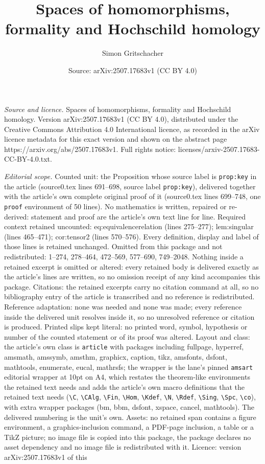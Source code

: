 \documentclass[10pt,a4paper]{amsart}
\title[Spaces of homomorphisms, formality and Hochschild homology]{Spaces of homomorphisms, formality and Hochschild homology}
\author{Simon Gritschacher}
\date{Source: arXiv:2507.17683v1 (CC BY 4.0)}
\begin{document}
\maketitle

\noindent\emph{Source and licence.} Spaces of homomorphisms, formality and Hochschild homology. Version arXiv:2507.17683v1 (CC BY 4.0), distributed under the Creative Commons Attribution 4.0 International licence, as recorded in the arXiv licence metadata for this exact version and shown on the abstract page https://arxiv.org/abs/2507.17683v1. Full rights notice: licenses/arxiv-2507.17683-CC-BY-4.0.txt.\par\smallskip

\noindent\textit{Editorial scope.} Counted unit: the Proposition whose source label is \texttt{prop:key} in the article (source0.tex lines 691--698, source label \texttt{prop:key}), delivered together with the article's own complete original proof of it (source0.tex lines 699--748, one \texttt{proof} environment of 50 lines). No mathematics is written, repaired or re-derived: statement and proof are the article's own text line for line. Required context retained uncounted: eq:equivalencerelation (lines 275--277); lem:singular (lines 465--471); cor:tensor2 (lines 570--576). Every definition, display and label of those lines is retained unchanged. Omitted from this package and not redistributed: 1--274, 278--464, 472--569, 577--690, 749--2048. Nothing inside a retained excerpt is omitted or altered: every retained body is delivered exactly as the article's lines are written, so no omission receipt of any kind accompanies this package. Citations: the retained excerpts carry no citation command at all, so no bibliography entry of the article is transcribed and no reference is redistributed. Reference adaptation: none was needed and none was made; every reference inside the delivered unit resolves inside it, so no unresolved reference or citation is produced. Printed slips kept literal: no printed word, symbol, hypothesis or number of the counted statement or of its proof was altered. Layout and class: the article's own class is \texttt{article} with packages including fullpage, hyperref, amsmath, amssymb, amsthm, graphicx, caption, tikz, amsfonts, dsfont, mathtools, enumerate, eucal, mathrsfs; the wrapper is the lane's pinned \texttt{amsart} editorial wrapper at 10pt on A4, which restates the theorem-like environments the retained text needs and adds the article's own macro definitions that the retained text needs (\texttt{\textbackslash C}, \texttt{\textbackslash CAlg}, \texttt{\textbackslash Fin}, \texttt{\textbackslash Hom}, \texttt{\textbackslash Kdef}, \texttt{\textbackslash N}, \texttt{\textbackslash Rdef}, \texttt{\textbackslash Sing}, \texttt{\textbackslash Spc}, \texttt{\textbackslash co}), with extra wrapper packages (bm, bbm, dsfont, xspace, cancel, mathtools). The delivered numbering is the unit's own. Assets: no retained span contains a figure environment, a graphics-inclusion command, a PDF-page inclusion, a table or a TikZ picture; no image file is copied into this package, the package declares no asset dependency and no image file is redistributed with it. Licence: version arXiv:2507.17683v1 of this 
\end{document}
